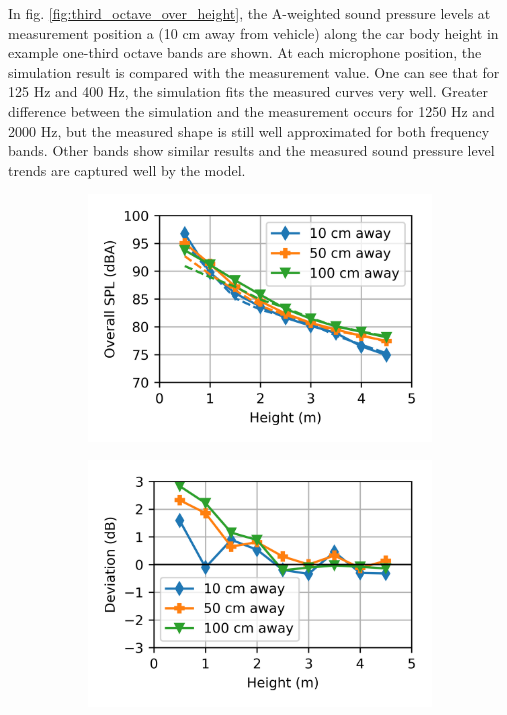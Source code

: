 \noindent In fig. \ref{fig:third_octave_over_height}, the A-weighted sound pressure levels at measurement position a (10 cm away from vehicle) along the car body height in example one-third octave bands are shown. At each microphone position, the simulation result is compared with the measurement value. One can see that for 125 Hz and 400 Hz, the simulation fits the measured curves very well. Greater difference between the simulation and the measurement occurs for 1250 Hz and 2000 Hz, but the measured shape is still well approximated for both frequency bands. Other bands show similar results and the measured sound pressure level trends are captured well by the model.

\begin{figure}[H]
	\centering
	\begin{subfigure}[b]{0.49\textwidth}
		\centering
		\includegraphics{fig/chap5/initial_model/overall_SPL/all_pos.png}
	\end{subfigure}
	\hfill
	\begin{subfigure}[b]{0.49\textwidth}
		\centering
		\includegraphics{fig/chap5/initial_model/overall_SPL/deviation.png}

\end{subfigure}
\end{figure}
